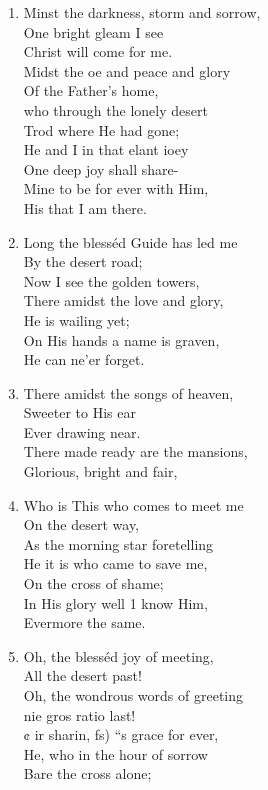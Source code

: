 \documentclass[11pt,a4paper]{article}
\begin{document}
\begin{enumerate}
    \item Minst the darkness, storm and sorrow, \\
        One bright gleam I see \\
        Christ will come for me. \\
        Midst the oe and peace and glory \\
        Of the Father's home, \\
        who through the lonely desert \\
        Trod where He had gone; \\
        He and I in that elant ioey \\
        One deep joy shall share- \\
        Mine to be for ever with Him, \\
        His that I am there.

    \item Long the blesséd Guide has led me \\
        By the desert road; \\
        Now I see the golden towers, \\
        There amidst the love and glory, \\
        He is wailing yet; \\
        On His hands a name is graven, \\
        He can ne'er forget.

    \item There amidst the songs of heaven, \\
        Sweeter to His ear \\
        Ever drawing near. \\
        There made ready are the mansions, \\
        Glorious, bright and fair,

    \item Who is This who comes to meet me \\
        On the desert way, \\
        As the morning star foretelling \\
        He it is who came to save me, \\
        On the cross of shame; \\
        In His glory well 1 know Him, \\
        Evermore the same.

    \item Oh, the blesséd joy of meeting, \\
        All the desert past! \\
        Oh, the wondrous words of greeting \\
        nie gros ratio last! \\
        ¢ ir sharin, fs) ``s grace for ever, \\
        He, who in the hour of sorrow \\
        Bare the cross alone;


\end{enumerate}
\end{document}

